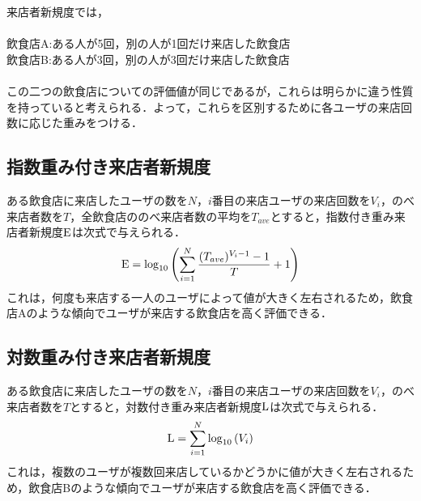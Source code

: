 来店者新規度では，\\\\
飲食店A:ある人が5回，別の人が1回だけ来店した飲食店\\
飲食店B:ある人が3回，別の人が3回だけ来店した飲食店\\\\
この二つの飲食店についての評価値が同じであるが，これらは明らかに違う性質を持っていると考えられる．よって，これらを区別するために各ユーザの来店回数に応じた重みをつける．

	\subsection{指数重み付き来店者新規度}

	ある飲食店に来店したユーザの数を$N$，$i$番目の来店ユーザの来店回数を$V_i$，のべ来店者数を$T$，全飲食店ののべ来店者数の平均を$T_{ave}$とすると，指数付き重み来店者新規度$\rm E$は次式で与えられる．
	\begin{equation}
		{\rm E} = \log_{10}{\left(\sum^{N}_{i=1} \frac{(T_{ave})^{V_i-1}-1}{T}+1\right)}
	\end{equation}
	これは，何度も来店する一人のユーザによって値が大きく左右されるため，飲食店Aのような傾向でユーザが来店する飲食店を高く評価できる．

	\subsection{対数重み付き来店者新規度}
	ある飲食店に来店したユーザの数を$N$，$i$番目の来店ユーザの来店回数を$V_i$，のべ来店者数を$T$とすると，対数付き重み来店者新規度$\rm L$は次式で与えられる．
	\begin{equation}
		{\rm L} = \sum^N_{i=1}{\log_{10}{\left(V_i \right)}}
	\end{equation}
	これは，複数のユーザが複数回来店しているかどうかに値が大きく左右されるため，飲食店Bのような傾向でユーザが来店する飲食店を高く評価できる．

